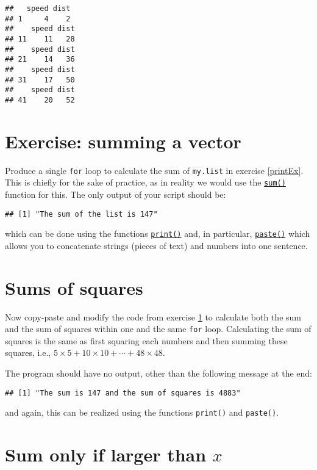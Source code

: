 \documentclass[
]{book}
\begin{document}
\begin{verbatim}
##   speed dist
## 1     4    2
##    speed dist
## 11    11   28
##    speed dist
## 21    14   36
##    speed dist
## 31    17   50
##    speed dist
## 41    20   52
\end{verbatim}

\hypertarget{sum}{%
\section{Exercise: summing a vector}\label{sum}}

Produce a single \texttt{for} loop to calculate the sum of \texttt{my.list}
in exercise \ref{printEx}. This is chiefly for the sake of
practice, as in reality we would use the \href{https://rdrr.io/r/base/sum.html}{\texttt{sum()}}
function for this. The only output of your script should be:

\begin{verbatim}
## [1] "The sum of the list is 147"
\end{verbatim}

which can be done using the functions \href{https://www.rdocumentation.org/packages/base/versions/3.6.2/topics/print}{\texttt{print()}}
and, in particular, \href{https://www.rdocumentation.org/packages/base/versions/3.6.2/topics/paste}{\texttt{paste()}} which allows you to concatenate strings (pieces of text) and numbers into one sentence.

\hypertarget{sumSq}{%
\section{Sums of squares}\label{sumSq}}

Now copy-paste and modify the code from exercise \ref{sum}
to calculate both the sum
and the sum of squares within one and the same \texttt{for} loop.
Calculating the sum of squares is the same as first squaring each
numbers and then summing these squares, i.e., \(5\times 5 + 10 \times 10 + \cdots + 48 \times 48\).

The program should have no output, other than the
following message at the end:

\begin{verbatim}
## [1] "The sum is 147 and the sum of squares is 4883"
\end{verbatim}

and again, this can be realized using the functions \texttt{print()} and \texttt{paste()}.

\hypertarget{sum-only-if-larger-than-x}{%
\section{\texorpdfstring{Sum only if larger than \(x\)}{Sum only if larger than x}}\label{sum-only-if-larger-than-x}}
\end{document}
